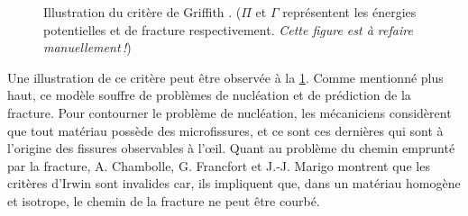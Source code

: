 \begin{figure}[!ht]
    \centering
    \caption{Illustration du critère de Griffith \parencite{gross2017fracture}. ($\Pi$ et $\Gamma$ représentent les énergies potentielles et de fracture respectivement. \textit{Cette figure est à refaire manuellement !})}
    \label{fig:Griffith}
\end{figure}

\noindent Une illustration de ce critère peut être observée à la \cref{fig:Griffith}. Comme mentionné plus haut, ce modèle souffre de problèmes de nucléation et de prédiction de la fracture. Pour contourner le problème de nucléation, les mécaniciens considèrent que tout matériau possède des microfissures, et ce sont ces dernières qui sont à l'origine des fissures observables à l'\oe{}il. Quant au problème du chemin emprunté par la fracture, A. Chambolle, G. Francfort et J.-J. Marigo \parencite{chambolle2009and} montrent que les critères d'Irwin \parencite{irwin1997analysis} sont invalides car, ils impliquent que, dans un matériau homogène et isotrope, le chemin de la fracture ne peut être courbé.

